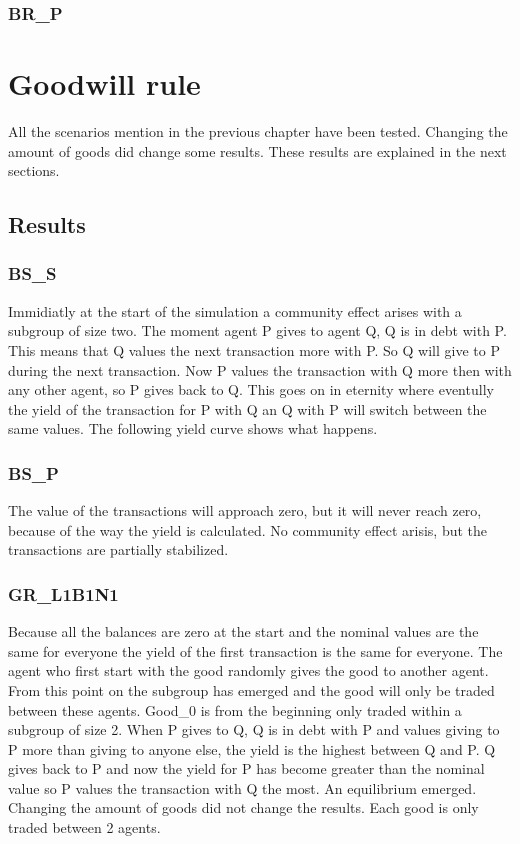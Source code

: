 \documentclass[twoside,openright]{uva-bachelor-thesis}
\begin{document}
\subsubsection{BR\_P}

\section{Goodwill rule}
All the scenarios mention in the previous chapter have been tested. Changing the amount of goods did change some results. These results are explained in the next sections.
\subsection{Results}

\subsubsection{BS\_S}
Immidiatly at the start of the simulation a community effect arises with a subgroup of size two. The moment agent P gives to agent Q, Q is in debt with P. This means that Q values the next transaction more with P. So Q will give to P during the next transaction. Now P values the transaction with Q more then with any other agent, so P gives back to Q. This goes on in eternity where eventully the yield of the transaction for P with Q an Q with P will switch between the same values. The following yield curve shows what happens. 

\subsubsection{BS\_P}
The value of the transactions will approach zero, but it will never reach zero, because of the way the yield is calculated. No community effect arisis, but the transactions are partially stabilized.

\subsubsection{GR\_L1B1N1}
Because all the balances are zero at the start and the nominal values are the same for everyone the yield of the first transaction is the same for everyone. The agent who first start with the good randomly gives the good to another agent. From this point on the subgroup has emerged and the good will only be traded between these agents. Good\_0 is from the beginning only traded within a subgroup of size 2.  When P gives to Q, Q is in debt with P and values giving to P more than giving to anyone else, the yield is the highest between Q and P. Q gives back to P and now the yield for P has become greater than the nominal value so P values the transaction with Q the most. An equilibrium emerged. Changing the amount of goods did not change the results. Each good is only traded between 2 agents.
\end{document}
